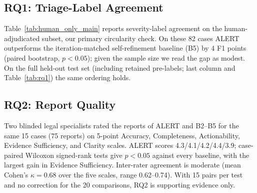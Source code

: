 \subsection{RQ1: Triage-Label Agreement}

Table~\ref{tab:human_only_main} reports severity-label agreement on the human-adjudicated subset, our primary circularity check. On these 82 cases ALERT outperforms the iteration-matched self-refinement baseline (B5) by 4 F1 points (paired bootstrap, $p<0.05$); given the sample size we read the gap as modest. On the full held-out test set (including retained pre-labels; last column and Table~\ref{tab:rq1}) the same ordering holds.

\begin{table}[t]
\centering
\caption{Macro severity-label agreement (point estimates). F1/P/R are on the 82-case human-adjudicated test split (primary result); the last column is F1 on the full held-out test set, which includes retained pre-labels (Table~\ref{tab:rq1}). Confidence intervals are not reported (Limitations).}
\label{tab:human_only_main}
\small
\setlength{\tabcolsep}{3pt}
\end{table}

\subsection{RQ2: Report Quality}

Two blinded legal specialists rated the reports of ALERT and B2--B5 for the same 15 cases (75 reports) on 5-point Accuracy, Completeness, Actionability, Evidence Sufficiency, and Clarity scales. ALERT scores 4.3/4.1/4.2/4.4/3.9; case-paired Wilcoxon signed-rank tests give $p<0.05$ against every baseline, with the largest gain in Evidence Sufficiency. Inter-rater agreement is moderate (mean Cohen's $\kappa=0.68$ over the five scales, range 0.62--0.74). With 15 pairs per test and no correction for the 20 comparisons, RQ2 is supporting evidence only.

